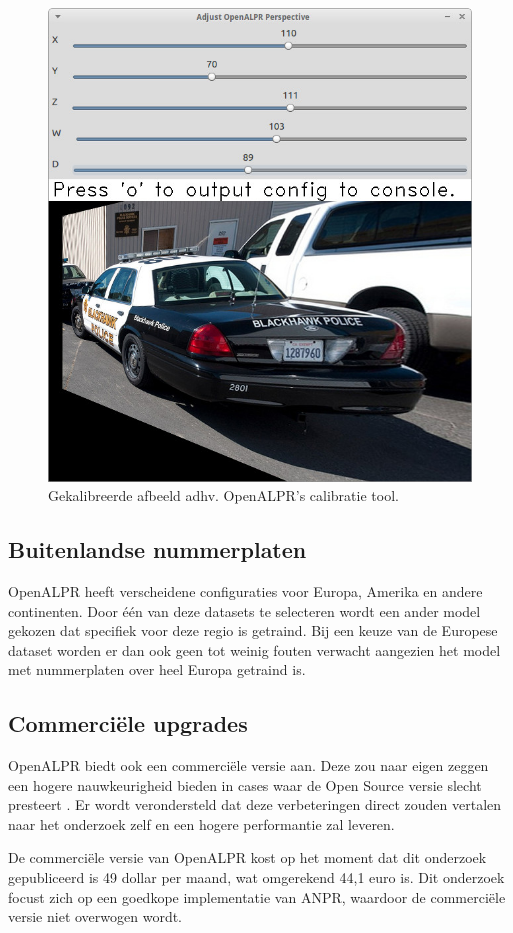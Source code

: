 \begin{figure}[h!]
	\centering
	\includegraphics[width=0.7\linewidth]{img/calibration/configuration_calibration_tool.jpg}
	\caption{Gekalibreerde afbeeld adhv. OpenALPR's calibratie tool. \autocite{openalpr2015pattern}}
	\label{calibration-openalpr-after}
\end{figure}

\subsection{Buitenlandse nummerplaten}
OpenALPR heeft verscheidene configuraties voor Europa, Amerika en andere continenten. Door één van deze datasets te selecteren wordt een ander model gekozen dat specifiek voor deze regio is getraind. Bij een keuze van de Europese dataset worden er dan ook geen tot weinig fouten verwacht aangezien het model met nummerplaten over heel Europa getraind is.

\subsection{Commerciële upgrades}
OpenALPR biedt ook een commerciële versie aan. Deze zou naar eigen zeggen een hogere nauwkeurigheid bieden in cases waar de Open Source versie slecht presteert \autocite{openalpr2019benchmark}. Er wordt verondersteld dat deze verbeteringen direct zouden vertalen naar het onderzoek zelf en een hogere performantie zal leveren.

De commerciële versie van OpenALPR kost op het moment dat dit onderzoek gepubliceerd is 49 dollar per maand, wat omgerekend 44,1 euro is. Dit onderzoek focust zich op een goedkope implementatie van ANPR, waardoor de commerciële versie niet overwogen wordt.